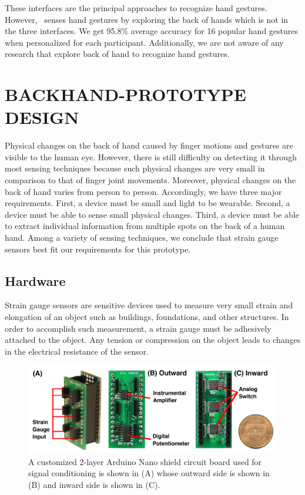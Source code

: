 \documentclass{sigchi}
\begin{document}
These interfaces are the principal approaches to recognize hand gestures. However, \getTitleName\ senses hand gestures by exploring the back of hands which is not in the three interfaces. We get 95.8\% average accuracy for 16 popular hand gestures when personalized for each participant. Additionally, we are not aware of any research that explore back of hand to recognize hand gestures.


\section{BACKHAND-PROTOTYPE DESIGN}

Physical changes on the back of hand caused by finger motions and gestures are visible to the human eye. However, there is still difficulty on detecting it through most sensing techniques because such physical changes are very small in comparison to that of finger joint movements. Moreover, physical changes on the back of hand varies from person to person. Accordingly, we have three major requirements. First, a device must be small and light to be wearable. Second, a device must be able to sense small physical changes. Third, a device must be able to extract individual information from multiple spots on the back of a human hand. Among a variety of sensing techniques, we conclude that strain gauge sensors best fit our requirements for this prototype.

\subsection{Hardware} 
Strain gauge sensors are sensitive devices used to measure very small strain and elongation of an object such as buildings, foundations, and other structures. In order to accomplish such measurement, a strain gauge must be adhesively attached to the object. Any tension or compression on the object leads to changes in the electrical resistance of the sensor.

\begin{figure}
  \begin{center}
  \includegraphics[width=1\columnwidth]{figures/harwareV2.jpg}
  \caption{ A customized 2-layer Arduino Nano shield circuit board used for signal conditioning is shown in (A) whose outward side is shown in (B) and inward side is shown in (C).}
  \label{fig:hardware}
  \end{center}
\end{figure}
\end{document}
